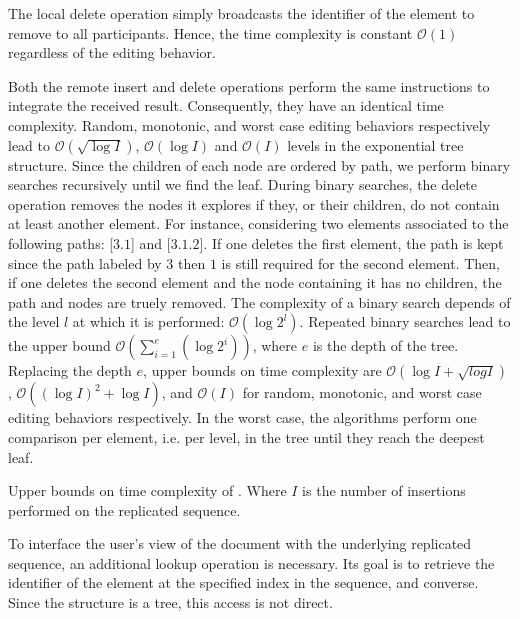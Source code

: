 The local delete operation simply broadcasts the identifier of the element to
remove to all participants. Hence, the time complexity is constant
$\mathcal{O}(1)$ regardless of the editing behavior.

Both the remote insert and delete operations perform the same instructions to
integrate the received result. Consequently, they have an identical time
complexity. Random, monotonic, and worst case editing behaviors respectively
lead to $\mathcal{O}(\sqrt{\log I})$, $\mathcal{O}(\log I)$ and $\mathcal{O}(I)$
levels in the exponential tree structure. Since the children of each node are
ordered by path, we perform binary searches recursively until we find the
leaf. During binary searches, the delete operation removes the nodes it explores
if they, or their children, do not contain at least another element. For
instance, considering two elements associated to the following paths: [$3.1$]
and [$3.1.2$]. If one deletes the first element, the path is kept since the path
labeled by $3$ then $1$ is still required for the second element. Then, if one
deletes the second element and the node containing it has no children, the path
and nodes are truely removed. The complexity of a binary search depends of the
level $l$ at which it is performed: $\mathcal{O}(\log 2^l)$. Repeated binary
searches lead to the upper bound
$\mathcal{O}(\textstyle\sum\nolimits_{i=1}^{e}(\log 2^i))$, where $e$ is the
depth of the tree. Replacing the depth $e$, upper bounds on time complexity are
$\mathcal{O}(\log I + \sqrt{log I})$, $\mathcal{O}((\log I)^2+\log I)$, and
$\mathcal{O}(I)$ for random, monotonic, and worst case editing behaviors
respectively. In the worst case, the algorithms perform one comparison per
element, i.e. per level, in the tree until they reach the deepest leaf.


\begin{table}
  \vspace{\ABOVETABLES}
  \caption{\label{table:lseqtime}
    Upper bounds on time complexity of \LSEQ. Where $I$ is the number of 
    insertions performed on the replicated sequence.}
  \centering
  
\end{table}

To interface the user's view of the document with the underlying replicated
sequence, an additional lookup operation is necessary. Its goal is to retrieve
the identifier of the element at the specified index in the sequence, and
converse. Since the structure is a tree, this access is not direct.

